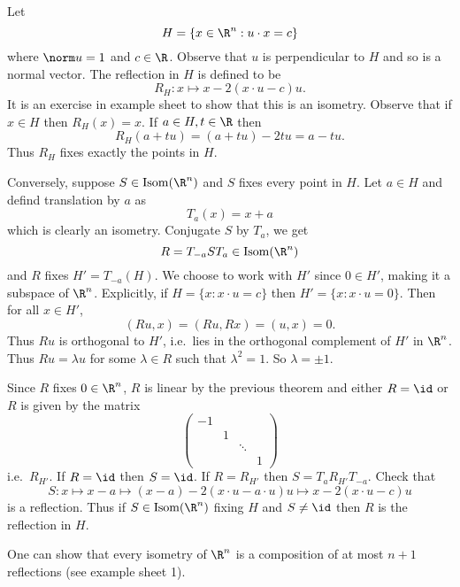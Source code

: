\documentclass[a4paper]{article}
\DeclareMathOperator{\Isom}{Isom}
\begin{document}
\begin{eg}
  Let
  \[
    H = \{x \in \R^n: u \cdot x = c\}
  \]
  where \(\norm u = 1\) and \(c \in \R\). Observe that \(u\) is perpendicular to \(H\) and so is a normal vector. The reflection in \(H\) is defined to be
  \[
    R_H: x \mapsto x - 2(x \cdot u - c)u.
  \]
  It is an exercise in example sheet to show that this is an isometry. Observe that if \(x \in H\) then \(R_H(x) = x\). If \(a \in H, t \in \R\) then
  \[
    R_H(a + tu) = (a + tu) - 2tu = a - tu.
  \]
  Thus \(R_H\) fixes exactly the points in \(H\).

  Conversely, suppose \(S \in \Isom(\R^n)\) and \(S\) fixes every point in \(H\). Let \(a \in H\) and defind translation by \(a\) as
  \[
    T_a(x) = x + a
  \]
  which is clearly an isometry. Conjugate \(S\) by \(T_a\), we get
  \[
    R = T_{-a}ST_a \in \Isom(\R^n)
  \]
  and \(R\) fixes \(H' = T_{-a}(H)\). We choose to work with \(H'\) since \(0 \in H'\), making it a subspace of \(\R^n\). Explicitly, if \(H = \{x: x\cdot u = c\}\) then \(H' = \{x: x \cdot u = 0\}\). Then for all \(x \in H'\),
  \[
    (Ru, x) = (Ru, Rx) = (u, x) = 0.
  \]
  Thus \(Ru\) is orthogonal to \(H'\), i.e.\ lies in the orthogonal complement of \(H'\) in \(\R^n\). Thus \(Ru = \lambda u\) for some \(\lambda \in R\) such that \(\lambda^2 = 1\). So \(\lambda = \pm 1\).

  Since \(R\) fixes \(0 \in \R^n\), \(R\) is linear by the previous theorem and either \(R = \id\) or \(R\) is given by the matrix
  \[
    \begin{pmatrix}
      -1 & & \\
      & 1 & \\
      & & \ddots \\
      & & & 1
    \end{pmatrix}
  \]
  i.e.\ \(R_{H'}\). If \(R = \id\) then \(S = \id\). If \(R = R_{H'}\) then \(S = T_aR_{H'}T_{-a}\). Check that
  \[
    S: x \mapsto x - a \mapsto (x - a) - 2(x \cdot u - a \cdot u) u \mapsto x - 2(x \cdot u - c)u
  \]
  is a reflection. Thus if \(S \in \Isom(\R^n)\) fixing \(H\) and \(S \neq \id \) then \(R\) is the reflection in \(H\).
\end{eg}

\begin{remark}
  One can show that every isometry of \(\R^n\) is a composition of at most \(n + 1\) reflections (see example sheet 1).
\end{remark}
\end{document}
